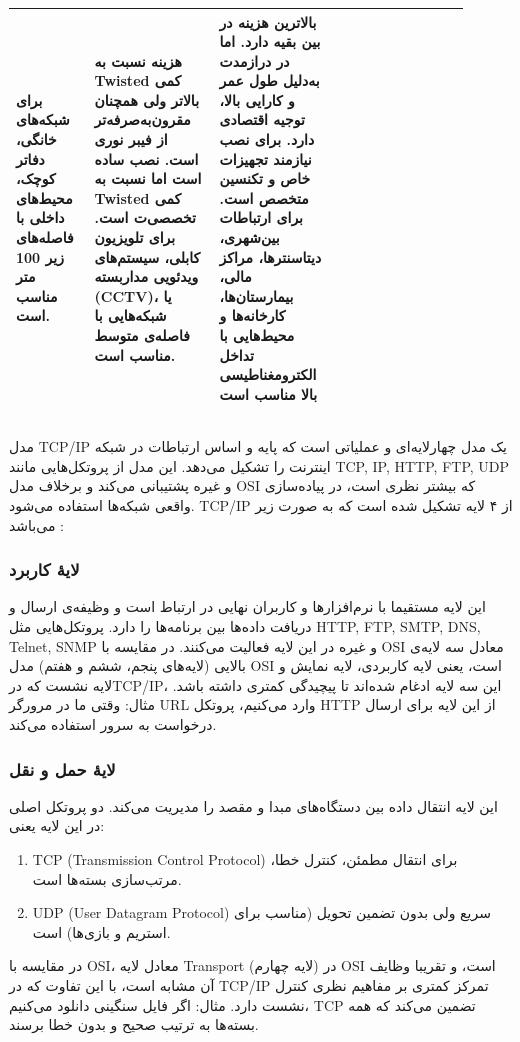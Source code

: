 \documentclass[12pt]{article}
\begin{document}
\begin{center}
\begin{table}[h]
\begin{tabular}{|p{0.15\linewidth}|p{0.25\linewidth}|p{0.25\linewidth}|p{0.25\linewidth}|}
				برای شبکه‌های خانگی، دفاتر کوچک، محیط‌های داخلی با فاصله‌های زیر 100 متر مناسب است. &
				هزینه نسبت به Twisted کمی بالاتر ولی همچنان مقرون‌به‌صرفه‌تر از فیبر نوری است. 
				نصب ساده است اما نسبت به Twisted کمی تخصصی‌ت است. برای تلویزیون کابلی، 
				سیستم‌های ویدئویی مداربسته (CCTV)، یا شبکه‌هایی با فاصله‌ی متوسط مناسب است. &
				بالاترین هزینه در بین بقیه دارد. اما در درازمدت به‌دلیل طول عمر و کارایی بالا، 
				توجیه اقتصادی دارد. برای نصب نیازمند تجهیزات خاص  و تکنسین متخصص است. 
				برای ارتباطات بین‌شهری، دیتاسنترها، مراکز مالی، بیمارستان‌ها، کارخانه‌ها و محیط‌هایی با 
				تداخل الکترومغناطیسی بالا مناسب است \\
				\hline
			\end{tabular}
		\end{table}
	\end{center}
	
	\subsection{}
	مدل TCP/IP یک مدل چهارلایه‌ای و عملیاتی است که پایه و اساس ارتباطات در شبکه اینترنت را تشکیل می‌دهد. این مدل از پروتکل‌هایی مانند \textenglish{TCP, IP, HTTP, FTP, UDP} و غیره پشتیبانی می‌کند و برخلاف مدل OSI که بیشتر نظری است، در پیاده‌سازی واقعی شبکه‌ها استفاده می‌شود. TCP/IP از ۴ لایه تشکیل شده است که به صورت زیر می‌باشد 
	\cite{a8, a9, a10}:
	\subsubsection*{لایهٔ کاربرد}
	این لایه مستقیما با نرم‌افزارها و کاربران نهایی در ارتباط است و وظیفه‌ی ارسال و دریافت داده‌ها بین برنامه‌ها را دارد. پروتکل‌هایی مثل \textenglish{HTTP, FTP, SMTP, DNS, Telnet, SNMP} و غیره در این لایه فعالیت می‌کنند. در مقایسه با OSI معادل سه لایه‌ی بالایی (لایه‌های پنجم، ششم و هفتم) مدل OSI است، یعنی لایه کاربردی، لایه نمایش و لایه نشست که درTCP/IP، این سه لایه ادغام شده‌اند تا پیچیدگی کمتری داشته باشد.  مثال: وقتی ما در مرورگر URL وارد می‌کنیم، پروتکل HTTP از این لایه برای ارسال درخواست به سرور استفاده می‌کند.
	\subsubsection*{لایهٔ حمل و نقل}
	این لایه انتقال داده بین دستگاه‌های مبدا و مقصد را مدیریت می‌کند. دو پروتکل اصلی در این لایه یعنی:
	\begin{enumerate}
		\item \textenglish{TCP (Transmission Control Protocol)} برای انتقال مطمئن، کنترل خطا، مرتب‌سازی بسته‌ها است.
		\item \textenglish{UDP (User Datagram Protocol)} سریع ولی بدون تضمین تحویل (مناسب برای استریم و بازی‌ها) است.
	\end{enumerate}
	در مقایسه با \textenglish{OSI}، معادل لایه Transport (لایه چهارم) در OSI است، و تقریبا وظایف آن مشابه است، با این تفاوت که در TCP/IP تمرکز کمتری بر مفاهیم نظری کنترل نشست دارد. مثال: اگر فایل سنگینی دانلود می‌کنیم، TCP تضمین می‌کند که همه بسته‌ها به ترتیب صحیح و بدون خطا برسند.
\end{document}
